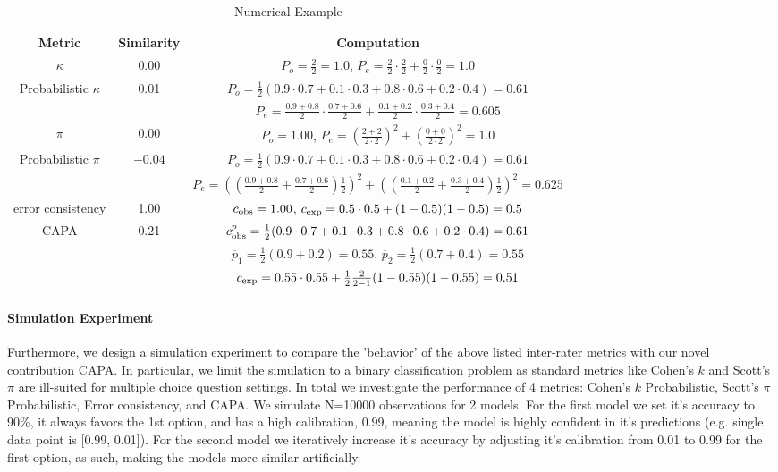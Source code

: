 \begin{table}[H]
    \centering
    \caption{Numerical Example}
    \begin{tabular}{ccc}
      \toprule 
      \textbf{Metric}  & \textbf{Similarity} & \textbf{Computation} \\
      \midrule
      $\kappa$ & 0.00 & $P_o = \frac{2}{2}=1.0$, $P_e = \frac{2}{2}\cdot\frac{2}{2} + \frac{0}{2}\cdot\frac{0}{2}=1.0$ \\
      Probabilistic $\kappa$ & 0.01 & $P_o = \frac{1}{2}(0.9\cdot0.7+0.1\cdot0.3+0.8\cdot0.6+0.2\cdot0.4)=0.61$ \\
      & & $P_e=\frac{0.9+0.8}{2} \cdot \frac{0.7+0.6}{2} + \frac{0.1+0.2}{2}\cdot\frac{0.3+0.4}{2}=0.605$ \\
      $\pi$ & 0.00 & $P_o = 1.00$, $P_e = (\frac{2+2}{2\cdot2})^2 + (\frac{0+0}{2\cdot2})^2 = 1.0$ \\
      Probabilistic $\pi$ & $-0.04$ & $P_o = \frac{1}{2}(0.9\cdot0.7+0.1\cdot0.3+0.8\cdot0.6+0.2\cdot0.4)=0.61$ \\
      & & $P_e = ((\frac{0.9+0.8}{2} + \frac{0.7+0.6}{2})\frac{1}{2})^2 +((\frac{0.1+0.2}{2} + \frac{0.3+0.4}{2})\frac{1}{2})^2 = 0.625 $ \\
      error consistency & 1.00 & $c_{\text{obs}} = 1.00$, $c_{\text{exp}} = 0.5\cdot0.5 + (1-0.5)(1-0.5)=0.5$ \\
      CAPA & 0.21 & $c_{\text{obs}}^{p}=\frac{1}{2}(0.9\cdot0.7+0.1\cdot0.3+0.8\cdot0.6+0.2\cdot0.4)=0.61$ \\
      & & $\overline{p}_1 = \frac{1}{2}(0.9+0.2)=0.55$, $\overline{p}_2 = \frac{1}{2}(0.7+0.4)=0.55$ \\
      & & $c_{\text{exp}} = 0.55\cdot 0.55 + \frac{1}{2}\frac{2}{2-1}(1-0.55)(1-0.55)=0.51 $ \\
      \bottomrule
    \end{tabular}
    \label{tab:metrics_numerical_ex}
\end{table}


\paragraph{Simulation Experiment} Furthermore, we design a simulation experiment to compare the 'behavior' of the above listed inter-rater metrics with our novel contribution CAPA. In particular, we limit the simulation to a binary classification problem as standard metrics like Cohen's $k$ and Scott's $\pi$ are ill-suited for multiple choice question settings. In total we investigate the performance of 4 metrics: Cohen's $k$ Probabilistic, Scott's $\pi$ Probabilistic, Error consistency, and CAPA. We simulate N=10000 observations for 2 models. For the first model we set it's accuracy to 90\%, it always favors the 1st option, and has a high calibration, 0.99, meaning the model is highly confident in it's predictions (e.g. single data point is [0.99, 0.01]). For the second model we iteratively increase it's accuracy by adjusting it's calibration from 0.01 to 0.99 for the first option, as such, making the models more similar artificially.

